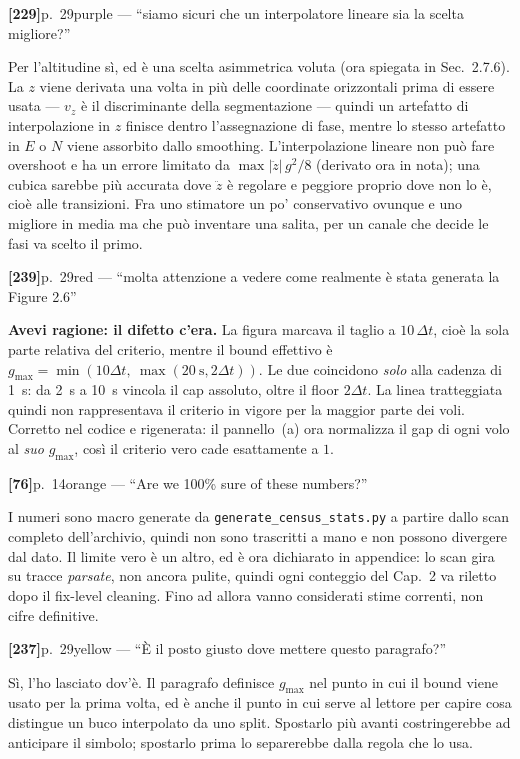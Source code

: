 \documentclass[11pt,a4paper]{article}
\newcommand{\ann}[3]{%
  \medskip\noindent\textbf{[#1]}\quad p.~#2\quad\textcolor{qcol}{\textsf{\small #3}}\par\nopagebreak}
\newcommand{\verdict}[1]{\textbf{\textcolor{vbad}{#1}}}
\begin{document}
\ann{229}{29}{purple --- \enquote{siamo sicuri che un interpolatore lineare sia la scelta
migliore?}}
Per l'altitudine sì, ed è una scelta asimmetrica voluta (ora spiegata in
Sec.~2.7.6). La $z$ viene derivata una volta in più delle coordinate orizzontali prima di
essere usata --- $v_z$ è il discriminante della segmentazione --- quindi un artefatto di
interpolazione in $z$ finisce dentro l'assegnazione di fase, mentre lo stesso artefatto in
$E$ o $N$ viene assorbito dallo smoothing. L'interpolazione lineare non può fare overshoot
e ha un errore limitato da $\max|\ddot z|\,g^2/8$ (derivato ora in nota); una cubica
sarebbe più accurata dove $\ddot z$ è regolare e peggiore proprio dove non lo è, cioè alle
transizioni. Fra uno stimatore un po' conservativo ovunque e uno migliore in media ma che
può inventare una salita, per un canale che decide le fasi va scelto il primo.

\ann{239}{29}{red --- \enquote{molta attenzione a vedere come realmente è stata generata la
Figure 2.6}}
\verdict{Avevi ragione: il difetto c'era.} La figura marcava il taglio a
$10\,\Delta t$, cioè la sola parte relativa del criterio, mentre il bound effettivo è
$g_{\max}=\min(10\Delta t,\ \max(\SI{20}{\second},2\Delta t))$. Le due coincidono
\emph{solo} alla cadenza di \SI{1}{\second}: da \SI{2}{\second} a \SI{10}{\second} vincola
il cap assoluto, oltre il floor $2\Delta t$. La linea tratteggiata quindi non rappresentava
il criterio in vigore per la maggior parte dei voli. Corretto nel codice e rigenerata: il
pannello~(a) ora normalizza il gap di ogni volo al \emph{suo} $g_{\max}$, così il criterio
vero cade esattamente a $1$.

\ann{76}{14}{orange --- \enquote{Are we 100\% sure of these numbers?}}
I numeri sono macro generate da \texttt{generate\_census\_stats.py} a partire dallo scan
completo dell'archivio, quindi non sono trascritti a mano e non possono divergere dal dato.
Il limite vero è un altro, ed è ora dichiarato in appendice: lo scan gira su tracce
\emph{parsate}, non ancora pulite, quindi ogni conteggio del Cap.~2 va riletto dopo il
fix-level cleaning. Fino ad allora vanno considerati stime correnti, non cifre definitive.

\ann{237}{29}{yellow --- \enquote{È il posto giusto dove mettere questo paragrafo?}}
Sì, l'ho lasciato dov'è. Il paragrafo definisce $g_{\max}$ nel punto in cui il bound viene
usato per la prima volta, ed è anche il punto in cui serve al lettore per capire cosa
distingue un buco interpolato da uno split. Spostarlo più avanti costringerebbe ad
anticipare il simbolo; spostarlo prima lo separerebbe dalla regola che lo usa.
\end{document}
